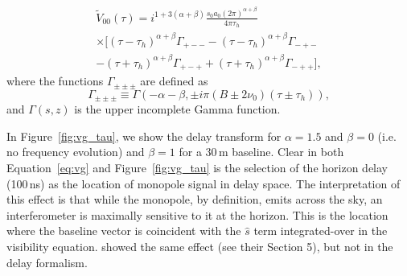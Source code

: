 \begin{multline}
\tilde{V}_{00}(\tau) = i^{1 + 3(\alpha+\beta)} \frac{s_0 a_0 (2\pi)^{\alpha+\beta}}{4\pi\tau_h} \\
\times \Big[(\tau-\tau_h)^{\alpha+\beta}\Gamma_{+--} - (\tau-\tau_h)^{\alpha+\beta}\Gamma_{-+-} \\
 - (\tau+\tau_h)^{\alpha+\beta}\Gamma_{+-+} + (\tau+\tau_h)^{\alpha+\beta}\Gamma_{-++}\Big], 
\label{eq:vg}
\end{multline}
where the functions $\Gamma_{\pm\pm\pm}$ are defined as
\begin{equation}
\Gamma_{\pm\pm\pm} \equiv \Gamma(-\alpha-\beta, \pm i \pi (B \pm 2\nu_0)(\tau \pm \tau_h)),
\end{equation}
and $\Gamma(s, z)$ is the upper incomplete Gamma function.

In Figure~\ref{fig:vg_tau}, we show the delay transform for $\alpha=1.5$ and $\beta=0$ (i.e. no frequency evolution) and $\beta=1$ for a 30\,m baseline. Clear in both Equation~\ref{eq:vg} and Figure~\ref{fig:vg_tau} is the selection of the horizon delay (100\,ns) as the location of monopole signal in delay space. 
The interpretation of this effect is that while the monopole, by definition, emits across the sky, an interferometer is maximally sensitive to it at the horizon. This is the location where the baseline vector is coincident with the $\hat{s}$ term integrated-over in the visibility equation. \cite{Venumadhav.16} showed the same effect (see their Section 5), but not in the delay formalism.


